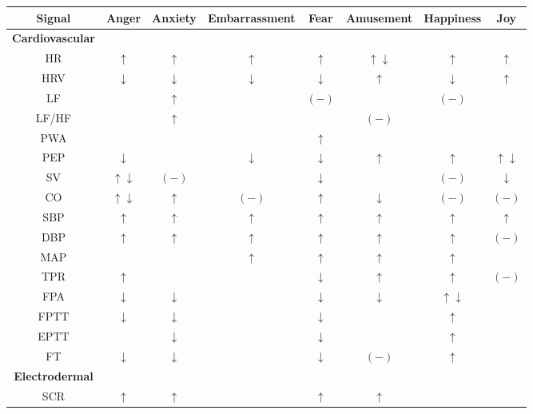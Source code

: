 \begin{table}[h!]
\begin{adjustwidth}{-3cm}{-1cm}
	\centering
	\begin{tabular}{|c|c|c|c|c|c|c|c|}
		\hline
		Signal & Anger & Anxiety & Embarrassment & Fear & Amusement & Happiness & Joy\\ [0.5ex] 
		\hline \hline \textbf{Cardiovascular} &&&&&&& \\ 
		\hline HR & $\uparrow$ & $\uparrow$ &  $\uparrow$ & $\uparrow$ & $\uparrow\downarrow$ & $\uparrow$ & $\uparrow$ \\
		\hline HRV & $\downarrow$ & $\downarrow$ & $\downarrow$ & $\downarrow$ & $\uparrow$ & $\downarrow$ & $\uparrow$ \\
		\hline LF & & $\uparrow$ & & $(-)$ & & $(-)$ & \\
		\hline LF/HF & & $\uparrow$ & & & $(-)$ & & \\
		\hline PWA & & & & $\uparrow$ & & & \\
		\hline PEP & $\downarrow$ & & $\downarrow$ & $\downarrow$ & $\uparrow$ & $\uparrow$ & $\uparrow\downarrow$ \\
		\hline SV & $\uparrow\downarrow$ & $(-)$ & & $\downarrow$ & & $(-)$ & $\downarrow$\\
		\hline CO & $\uparrow\downarrow$ & $\uparrow$ & $(-)$ & $\uparrow$ & $\downarrow$ & $(-)$ & $(-)$ \\
		\hline SBP & $\uparrow$ & $\uparrow$ & $\uparrow$ & $\uparrow$ & $\uparrow$ & $\uparrow$ & $\uparrow$ \\
		\hline DBP & $\uparrow$ & $\uparrow$ & $\uparrow$ & $\uparrow$ & $\uparrow$ & $\uparrow$ & $(-)$\\
		\hline MAP & & & $\uparrow$ & $\uparrow$ & $\uparrow$ & $\uparrow$ & \\
		\hline TPR & $\uparrow$ & & & $\downarrow$ & $\uparrow$ & $\uparrow$ & $(-)$ \\
		\hline FPA & $\downarrow$ & $\downarrow$ & & $\downarrow$ & $\downarrow$ & $\uparrow\downarrow$ & \\
		\hline FPTT  & $\downarrow$ & $\downarrow$ & & $\downarrow$ & & $\uparrow$ & \\
		\hline EPTT & & $\downarrow$ & & $\downarrow$ & & $\uparrow$ & \\
		\hline FT  & $\downarrow$ & $\downarrow$ & & $\downarrow$ & $(-)$ & $\uparrow$ &\\
		\hline \hline \textbf{Electrodermal} &&&&&&& \\ 
		\hline SCR & $\uparrow$ & $\uparrow$ & & $\uparrow$ & $\uparrow$ & & \\

\end{tabular}
\end{adjustwidth}
\end{table}
